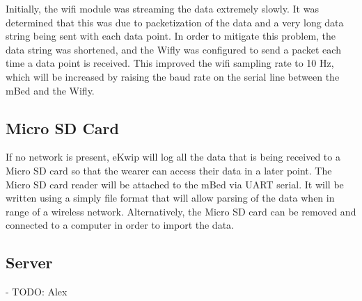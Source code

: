 Initially, the wifi module was streaming the data extremely slowly. It was determined that this was due to packetization of the data and a very long data string being sent with each data point. In order to mitigate this problem, the data string was shortened, and the Wifly was configured to send a packet each time a data point is received. This improved the wifi sampling rate to 10 Hz, which will be increased by raising the baud rate on the serial line between the mBed and the Wifly.

\subsection {Micro SD Card}
If no network is present, eKwip will log all the data that is being received to a Micro SD card so that the wearer can access their data in a later point. The Micro SD card reader will be attached to the mBed via UART serial. It will be written using a simply file format that will allow parsing of the data when in range of a wireless network. Alternatively, the Micro SD card can be removed and connected to a computer in order to import the data.

\subsection {Server}
- TODO: Alex
